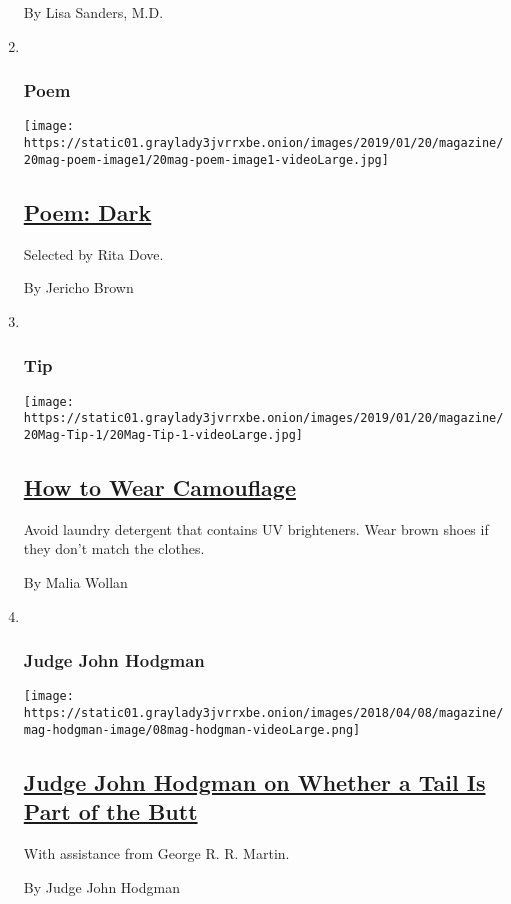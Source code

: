 \begin{enumerate}
  By Lisa Sanders, M.D.
\item ~
  \hypertarget{poem}{%
  \subsubsection{Poem}\label{poem}}

  \texttt{[image: https://static01.graylady3jvrrxbe.onion/images/2019/01/20/magazine/20mag-poem-image1/20mag-poem-image1-videoLarge.jpg]}

  \hypertarget{poem-dark}{%
  \subsection{\texorpdfstring{\href{/2019/01/17/magazine/poem-dark.html}{Poem:
  Dark}}{Poem: Dark}}\label{poem-dark}}

  Selected by Rita Dove.

  By Jericho Brown
\item ~
  \hypertarget{tip}{%
  \subsubsection{Tip}\label{tip}}

  \texttt{[image: https://static01.graylady3jvrrxbe.onion/images/2019/01/20/magazine/20Mag-Tip-1/20Mag-Tip-1-videoLarge.jpg]}

  \hypertarget{how-to-wear-camouflage}{%
  \subsection{\texorpdfstring{\href{/2019/01/16/magazine/how-to-wear-camouflage.html}{How
  to Wear
  Camouflage}}{How to Wear Camouflage}}\label{how-to-wear-camouflage}}

  Avoid laundry detergent that contains UV brighteners. Wear brown shoes
  if they don't match the clothes.

  By Malia Wollan
\item ~
  \hypertarget{judge-john-hodgman}{%
  \subsubsection{Judge John Hodgman}\label{judge-john-hodgman}}

  \texttt{[image: https://static01.graylady3jvrrxbe.onion/images/2018/04/08/magazine/mag-hodgman-image/08mag-hodgman-videoLarge.png]}

  \hypertarget{judge-john-hodgman-on-whether-a-tail-is-part-of-the-butt}{%
  \subsection{\texorpdfstring{\href{/2019/01/17/magazine/judge-john-hodgman-on-whether-a-tail-is-part-of-the-butt.html}{Judge
  John Hodgman on Whether a Tail Is Part of the
  Butt}}{Judge John Hodgman on Whether a Tail Is Part of the Butt}}\label{judge-john-hodgman-on-whether-a-tail-is-part-of-the-butt}}

  With assistance from George R. R. Martin.

  By Judge John Hodgman
\end{enumerate}

